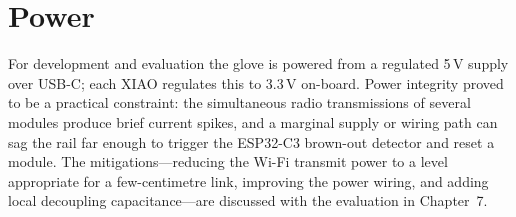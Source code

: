 \section{Power}

For development and evaluation the glove is powered from a regulated 5\,V
supply over USB-C; each XIAO regulates this to 3.3\,V on-board. Power integrity
proved to be a practical constraint: the simultaneous radio transmissions of
several modules produce brief current spikes, and a marginal supply or wiring
path can sag the rail far enough to trigger the ESP32-C3 brown-out detector and
reset a module. The mitigations—reducing the Wi-Fi transmit power to a level
appropriate for a few-centimetre link, improving the power wiring, and adding
local decoupling capacitance—are discussed with the evaluation in Chapter~7.
